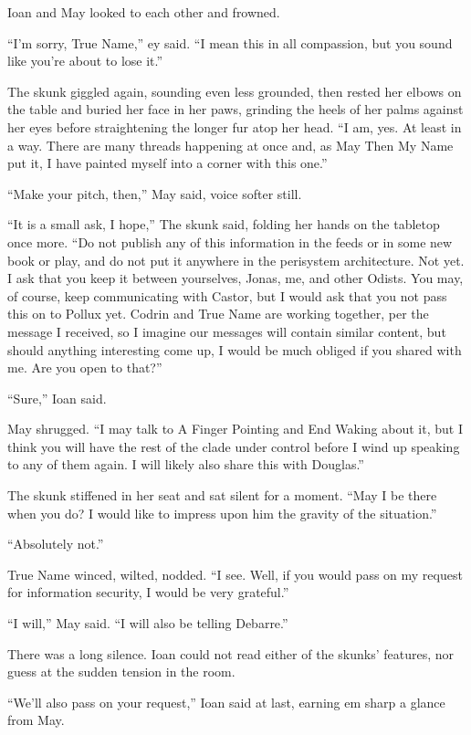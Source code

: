 Ioan and May looked to each other and frowned.

``I'm sorry, True Name,'' ey said. ``I mean this in all compassion, but you sound like you're about to lose it.''

The skunk giggled again, sounding even less grounded, then rested her elbows on the table and buried her face in her paws, grinding the heels of her palms against her eyes before straightening the longer fur atop her head. ``I am, yes. At least in a way. There are many threads happening at once and, as May Then My Name put it, I have painted myself into a corner with this one.''

``Make your pitch, then,'' May said, voice softer still.

``It is a small ask, I hope,'' The skunk said, folding her hands on the tabletop once more. ``Do not publish any of this information in the feeds or in some new book or play, and do not put it anywhere in the perisystem architecture. Not yet. I ask that you keep it between yourselves, Jonas, me, and other Odists. You may, of course, keep communicating with Castor, but I would ask that you not pass this on to Pollux yet. Codrin and True Name are working together, per the message I received, so I imagine our messages will contain similar content, but should anything interesting come up, I would be much obliged if you shared with me. Are you open to that?''

``Sure,'' Ioan said.

May shrugged. ``I may talk to A Finger Pointing and End Waking about it, but I think you will have the rest of the clade under control before I wind up speaking to any of them again. I will likely also share this with Douglas.''

The skunk stiffened in her seat and sat silent for a moment. ``May I be there when you do? I would like to impress upon him the gravity of the situation.''

``Absolutely not.''

True Name winced, wilted, nodded. ``I see. Well, if you would pass on my request for information security, I would be very grateful.''

``I will,'' May said. ``I will also be telling Debarre.''

There was a long silence. Ioan could not read either of the skunks’ features, nor guess at the sudden tension in the room.

``We'll also pass on your request,'' Ioan said at last, earning em sharp a glance from May.

